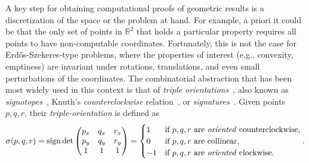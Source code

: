 A key step for obtaining computational proofs of geometric results is a discretization of the space or the problem at hand. For example, a priori it could be that the only set of points in $\mathbb{R}^2$ that holds a particular property requires all points to have non-computable coordinates. Fortunately, this is not the case for Erd\H{o}s-Szekeres-type problems, where the properties of interest (e.g., convexity, emptiness) are invariant under rotations, translations, and even small perturbations of the coordinates. 
The combinatorial abstraction that has been most widely used in this context is that of \emph{triple orientations}~\cite{ emptyHexagonNumber, scheucherTwoDisjoint5holes2020}, also known as \emph{signotopes}~\cite{felsnerSweepsArrangementsSignotopes2001, subercaseaux2023minimizing},  Knuth's \emph{counterclockwise} relation~\cite{knuthAxiomsHulls1992}, or \emph{signatures}~\cite{szekeres_peters_2006}. Given points $p, q, r$, their \emph{triple-orientation} is defined as 
\newcommand{\sign}{\operatorname{sign}}
\[
  \sigma(p, q, r) = \sign \det \begin{pmatrix} p_x & q_x & r_x \\ p_y & q_y & r_y \\ 1 & 1 & 1 \end{pmatrix} = \begin{cases}
    1 & \text{if } p, q, r \text{ are \emph{oriented} counterclockwise}, \\
    0 & \text{if } p, q, r \text{ are collinear}, \\
    -1 & \text{if } p, q, r \text{ are \emph{oriented} clockwise}.
  \end{cases}.
\]

